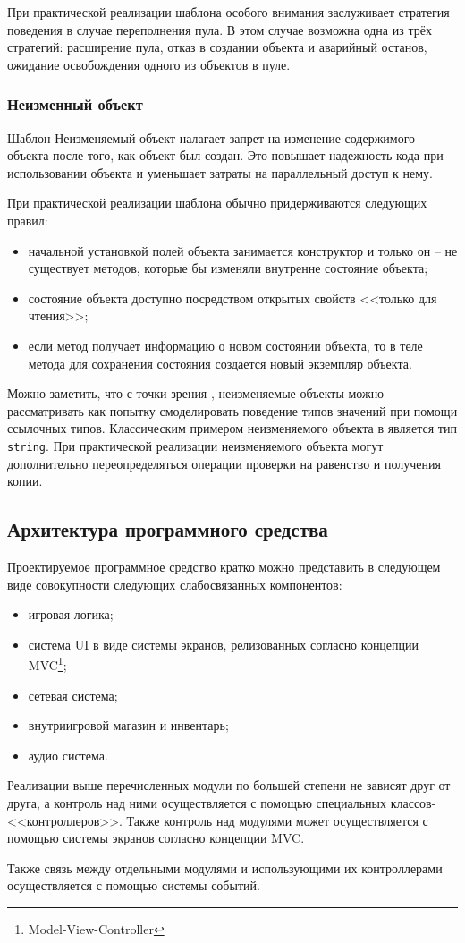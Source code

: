 При практической реализации шаблона особого внимания заслуживает стратегия поведения в случае переполнения пула. В этом случае возможна одна из трёх стратегий: расширение пула, отказ в создании объекта и аварийный останов, ожидание освобождения одного из объектов в пуле.


\subsubsection{Неизменный объект}

Шаблон Неизменяемый объект налагает запрет на изменение содержимого объекта после того, как объект был создан. Это повышает надежность кода при использовании объекта и уменьшает затраты на параллельный доступ к нему.

При практической реализации шаблона обычно придерживаются следующих правил:
\begin{itemize}
    \item начальной установкой полей объекта занимается конструктор и только он -- не существует методов, которые бы изменяли внутренне состояние объекта;
    \item состояние объекта доступно посредством открытых свойств <<только для чтения>>;
    \item если метод получает информацию о новом состоянии объекта, то в теле метода для сохранения состояния создается новый экземпляр объекта.
\end{itemize}

Можно заметить, что с точки зрения \DotNet, неизменяемые объекты можно рассматривать как попытку смоделировать поведение типов значений при помощи ссылочных типов. Классическим примером неизменяемого объекта в \DotNet является тип \lstinline{string}. При практической реализации неизменяемого объекта могут дополнительно переопределяться операции проверки на равенство и получения копии.


\subsection{Архитектура программного средства}

Проектируемое программное средство кратко можно представить в следующем виде совокупности следующих слабосвязанных компонентов:
\begin{itemize}
    \item игровая логика;
    \item система UI в виде системы экранов, релизованных согласно концепции MVC\footnote{Model-View-Controller};
    \item сетевая система;
    \item внутриигровой магазин и инвентарь;
    \item аудио система.
\end{itemize}

Реализации выше перечисленных модули по большей степени не зависят друг от друга, а контроль над ними осуществляется с помощью специальных классов-<<контроллеров>>. Также контроль над модулями может осуществляется с помощью системы экранов согласно концепции MVC.

Также связь между отдельными модулями и использующими их контроллерами осуществляется с помощью системы событий.